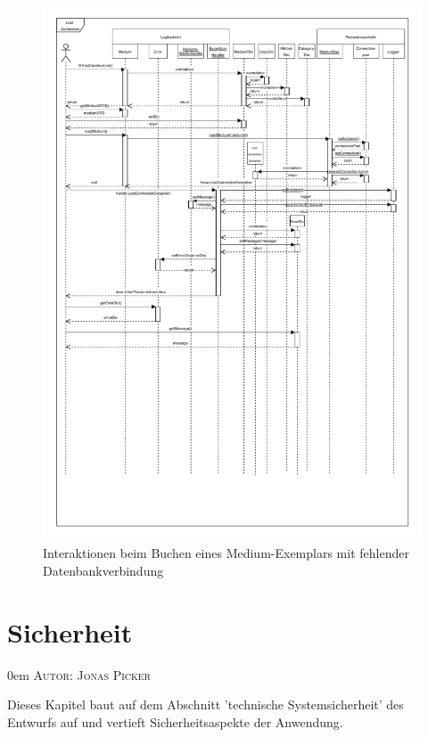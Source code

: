 \documentclass{article}
\makeatletter
\newcommand{\sectionauthor}[1]{
	{\parindent 0em \large \scshape Autor: #1 \par \nobreak \vspace*{1em}}
	\@afterheading
}
\makeatother
\begin{document}
\begin{figure}[h]
	\hypertarget{Fehlersequenz}{}
    \centering
    \includegraphics[width = 50em]{Sequenzdiagramm-exception-v5.0}
    \caption{Interaktionen beim Buchen eines Medium-Exemplars mit fehlender Datenbankverbindung}
    \label{Sequenzdiagramm}
\end{figure}

\restoregeometry
\newpage

\section{Sicherheit}
\sectionauthor{Jonas Picker}
Dieses Kapitel baut auf dem Abschnitt 'technische Systemsicherheit' des Entwurfs auf und vertieft Sicherheitsaspekte der Anwendung.
\end{document}
